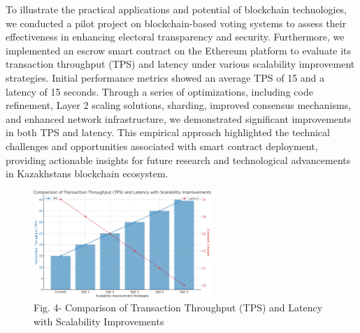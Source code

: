 \begin{multicols}{2}
To illustrate the practical applications and potential of blockchain
technologies, we conducted a pilot project on blockchain-based voting
systems to assess their effectiveness in enhancing electoral
transparency and security. Furthermore, we implemented an escrow smart
contract on the Ethereum platform to evaluate its transaction throughput
(TPS) and latency under various scalability improvement strategies.
Initial performance metrics showed an average TPS of 15 and a latency of
15 seconds. Through a series of optimizations, including code
refinement, Layer 2 scaling solutions, sharding, improved consensus
mechanisms, and enhanced network infrastructure, we demonstrated
significant improvements in both TPS and latency. This empirical
approach highlighted the technical challenges and opportunities
associated with smart contract deployment, providing actionable insights
for future research and technological advancements in
Kazakhstan\textquotesingle s blockchain ecosystem.
\end{multicols}

\begin{figure}[H]
	\centering
	\includegraphics[width=0.6\textwidth]{assets/81}
	\caption*{Fig. 4- Comparison of Transaction Throughput (TPS) and Latency with Scalability Improvements}
\end{figure}


